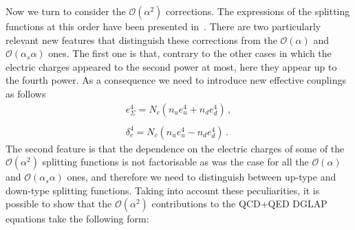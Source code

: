 Now we turn to consider the $\mathcal{O}(\alpha^2)$ corrections.
%
The expressions of the splitting functions at this order
have been presented in~\cite{deFlorian:2016gvk}.
%
There are two particularly relevant new
features that distinguish these corrections from the
$\mathcal{O}(\alpha)$ and $\mathcal{O}(\alpha_s\alpha)$ ones.
%
The first one is that, contrary to the
other cases in which the electric charges appeared to the second power
at most, here they appear up to the fourth power.
%
As a consequence
we need to introduce  new effective couplings as follows
\begin{equation}
\begin{array}{l}
e_{\Sigma}^4 = N_c(n_{u} e_u^4 + n_{d} e_d^4)\,,\\
\\
\delta_e^4 = N_c(n_{u} e_u^4 - n_{d} e_d^4)\,.
\end{array}
\end{equation}
The second feature is that the dependence on the electric charges of
some of the $\mathcal{O}(\alpha^2)$ splitting functions is not
factorisable as was the case for all the $\mathcal{O}(\alpha)$ and
$\mathcal{O}(\alpha_s\alpha)$ ones,
and therefore we need to
distinguish between up-type and down-type splitting functions.
%
Taking into account these peculiarities,
it is possible to show that  the $\mathcal{O}(\alpha^2)$ contributions to
the QCD+QED DGLAP equations take the following form:
